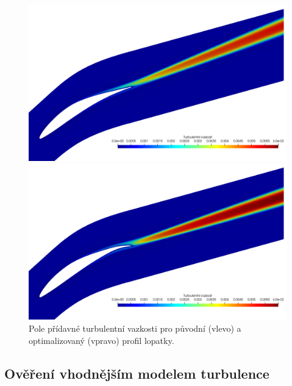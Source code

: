 \begin{figure}
\centering
\begin{minipage}[t]{0.48\textwidth}
	\centering
	\includegraphics[width=1\textwidth]{img/nut_0.png}
\end{minipage}
\hfill
\begin{minipage}[t]{0.48\textwidth}
	\centering
	\includegraphics[width=1\textwidth]{img/nut_12.png}
\end{minipage}
\caption{Pole přídavné turbulentní vazkosti pro původní (vlevo) a optimalizovaný (vpravo) profil lopatky.}
\label{fig:ghs1_nut}
\end{figure}




\subsection{Ověření vhodnějším modelem turbulence}









